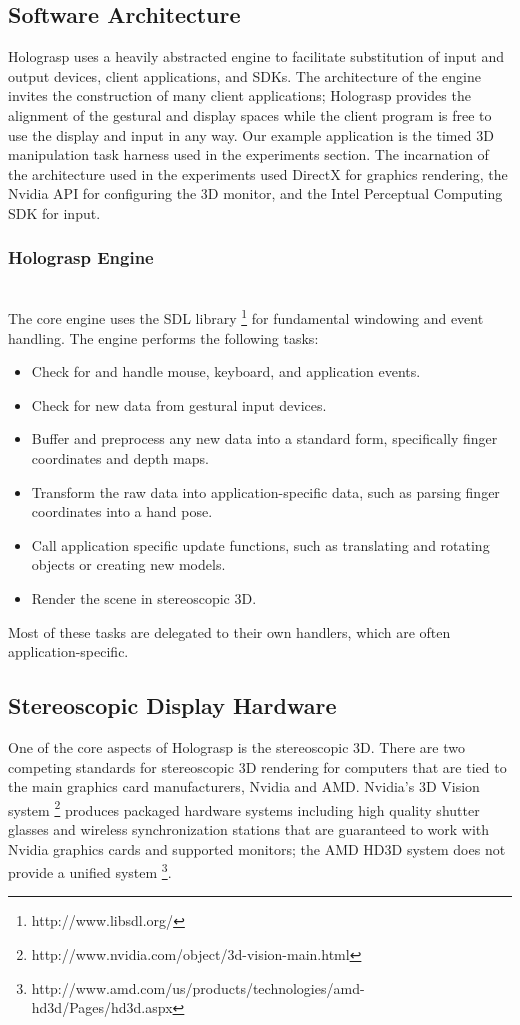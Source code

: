 \documentclass[pageno]{jpaper}
\begin{document}
\subsection{Software Architecture}
Holograsp uses a heavily abstracted engine to facilitate substitution of input and output devices, client applications, and SDKs.
The architecture of the engine invites the construction of many client applications; Holograsp provides the alignment of the
gestural and display spaces while the client program is free to use the display and input in any way. Our example application
is the timed 3D manipulation task harness used in the experiments section. The incarnation of the architecture used in the
experiments used DirectX for graphics rendering, the Nvidia API for configuring the 3D monitor, and the Intel Perceptual
Computing SDK for input.
\subsubsection{Holograsp Engine}$ $\\
The core engine uses the SDL library \footnote{http://www.libsdl.org/} for fundamental windowing and event handling.
The engine performs the following tasks:
\begin{itemize}
\item Check for and handle mouse, keyboard, and application events.
\item Check for new data from gestural input devices.
\item Buffer and preprocess any new data into a standard form, specifically finger coordinates and depth maps.
\item Transform the raw data into application-specific data, such as parsing finger coordinates into a hand pose.
\item Call application specific update functions, such as translating and rotating objects or creating new models.
\item Render the scene in stereoscopic 3D.
\end{itemize}

Most of these tasks are delegated to their own handlers, which are often application-specific.

\subsection{Stereoscopic Display Hardware}
One of the core aspects of Holograsp is the stereoscopic 3D. There are two competing standards for stereoscopic 3D rendering for computers
that are tied to the main graphics card manufacturers, Nvidia and AMD. Nvidia's 3D Vision system \footnote{http://www.nvidia.com/object/3d-vision-main.html}
produces packaged hardware systems including high quality shutter glasses and wireless synchronization stations that are guaranteed to work with Nvidia
graphics cards and supported monitors; the AMD HD3D system does not provide a unified system \footnote{http://www.amd.com/us/products/technologies/amd-hd3d/Pages/hd3d.aspx}.
\end{document}
